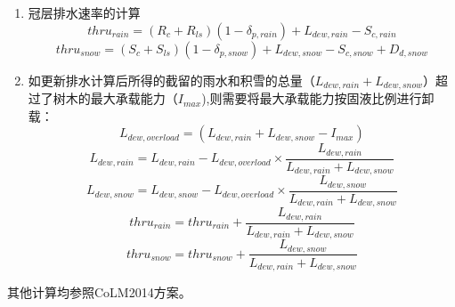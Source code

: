 \begin{enumerate}
\item 冠层排水速率的计算
\begin{equation}
thru_{rain}=\left(R_{c}+R_{ls}\right)\left(1-\delta_{p,rain}\right)+L_{dew,rain}-S_{c,rain}
\end{equation}
\begin{equation}
thru_{snow}=\left(S_{c}+S_{ls}\right)\left(1-\delta_{p,snow}\right)+L_{dew,snow}-S_{c,snow}+D_{d,snow}
\end{equation}

\item 如更新排水计算后所得的截留的雨水和积雪的总量（$L_{dew,rain}+L_{dew,snow}$）超过了树木的最大承载能力（$I_{max}$),则需要将最大承载能力按固液比例进行卸载：
\begin{equation}
L_{dew,overload}=(L_{dew,rain}+L_{dew,snow}-I_{max})
\end{equation}
\begin{equation}
L_{dew,rain}=L_{dew,rain} - L_{dew,overload} \times \frac{L_{dew,rain}}{L_{dew,rain}+L_{dew,snow}}
\end{equation}
\begin{equation}
L_{dew,snow}=L_{dew,snow} - L_{dew,overload} \times   \frac{L_{dew,snow}}{L_{dew,rain}+L_{dew,snow}}
\end{equation}
\begin{equation}
thru_{rain}=thru_{rain} + \frac{L_{dew,rain}}{L_{dew,rain}+L_{dew,snow}}
\end{equation}
\begin{equation}
thru_{snow}=thru_{snow} + \frac{L_{dew,snow}}{L_{dew,rain}+L_{dew,snow}}
\end{equation}
\end{enumerate}
其他计算均参照CoLM2014方案。

